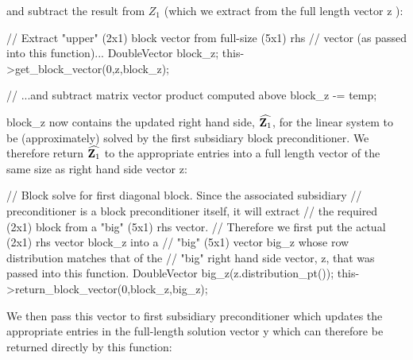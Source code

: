 and subtract the result from $ Z_1 $ (which we extract from the full length vector {\ttfamily z} )\+:


\begin{DoxyCodeInclude}
  \textcolor{comment}{// Extract "upper" (2x1) block vector from full-size (5x1) rhs }
  \textcolor{comment}{// vector (as passed into this function)...}
  DoubleVector block\_z;
  this->get\_block\_vector(0,z,block\_z);

  \textcolor{comment}{// ...and subtract matrix vector product computed above}
  block\_z -= temp;   

\end{DoxyCodeInclude}


{\ttfamily block\+\_\+z} now contains the updated right hand side, $ \widehat{{\bf Z}_1}$, for the linear system to be (approximately) solved by the first subsidiary block preconditioner. We therefore return $ \widehat{{\bf Z}_1}$ to the appropriate entries into a full length vector of the same size as right hand side vector {\ttfamily z\+:} 


\begin{DoxyCodeInclude}

  \textcolor{comment}{// Block solve for first diagonal block. Since the associated subsidiary }
  \textcolor{comment}{// preconditioner is a block preconditioner itself, it will extract }
  \textcolor{comment}{// the required (2x1) block from a "big" (5x1) rhs vector.}
  \textcolor{comment}{// Therefore we first put the actual (2x1) rhs vector block\_z into a}
  \textcolor{comment}{// "big" (5x1) vector big\_z whose row distribution matches that of the}
  \textcolor{comment}{// "big" right hand side vector, z, that was passed into this function.}
  DoubleVector big\_z(z.distribution\_pt());
  this->return\_block\_vector(0,block\_z,big\_z);

\end{DoxyCodeInclude}


We then pass this vector to first subsidiary preconditioner which updates the appropriate entries in the full-\/length solution vector {\ttfamily y} which can therefore be returned directly by this function\+:


